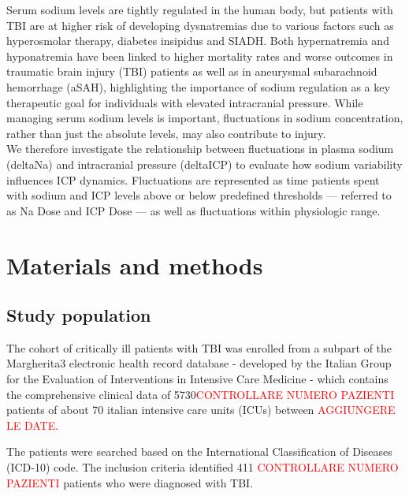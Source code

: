 Serum sodium levels are tightly regulated in the human body, but patients with TBI are at higher risk of developing dysnatremias due to various factors such as hyperosmolar therapy, diabetes insipidus and SIADH. Both hypernatremia\cite{maggioreRelationIncidenceHypernatremia2009a}\cite{vedantamMorbidityMortalityAssociated2017a} and hyponatremia \cite{yumotoPrevalenceRiskFactors2015a} have been linked to higher mortality rates and worse outcomes in traumatic brain injury (TBI) patients as well as in aneurysmal subarachnoid hemorrhage (aSAH)\cite{labibSodiumItsImpact2024}\cite{balesEffectHyponatremiaSodium2016}, highlighting the importance of sodium regulation as a key therapeutic goal for individuals with elevated intracranial pressure. While managing serum sodium levels is important, fluctuations in sodium concentration, rather than just the absolute levels, may also  contribute to injury.\\

We therefore investigate the relationship between fluctuations in plasma sodium (deltaNa) and intracranial pressure (deltaICP) to evaluate how sodium variability influences ICP dynamics. Fluctuations are represented as time patients spent with sodium and ICP levels above or below predefined thresholds — referred to as Na Dose and ICP Dose — as well as  fluctuations within physiologic range.\\

\section {Materials and methods}
\subsection{Study population}
The cohort of critically ill patients with TBI was enrolled from a subpart of the Margherita3 electronic health record database - developed by the Italian Group for the Evaluation of Interventions in Intensive Care Medicine\cite{finazziDataCollectionResearch2018} - which contains the comprehensive clinical data of 5730\textcolor{red}{CONTROLLARE NUMERO PAZIENTI} patients of about 70 italian intensive care units (ICUs) between \textcolor{red}{AGGIUNGERE LE DATE}. 

The patients were searched based on the International Classification of Diseases (ICD-10) code. The inclusion criteria identified 411 \textcolor{red}{CONTROLLARE NUMERO PAZIENTI} patients who were diagnosed with TBI.\\

